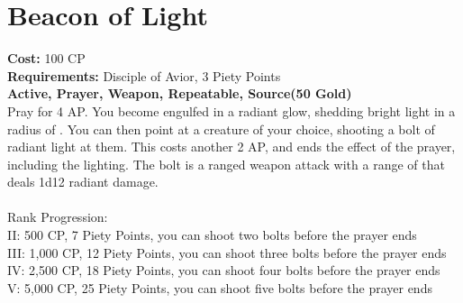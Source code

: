 \section{Beacon of Light}\label{prayer:beaconOfLight}
\textbf{Cost:} 100 CP\\
\textbf{Requirements:} Disciple of Avior, 3 Piety Points \\
\textbf{Active, Prayer, Weapon, Repeatable, Source(50 Gold)}\\
Pray for 4 AP. You become engulfed in a radiant glow, shedding bright light in a radius of .
You can then point at a creature of your choice, shooting a bolt of radiant light at them.
This costs another 2 AP, and ends the effect of the prayer, including the lighting.
The bolt is a ranged weapon attack with a range of  that deals 1d12 radiant damage.\\
\\
Rank Progression:\\
II: 500 CP, 7 Piety Points, you can shoot two bolts before the prayer ends\\
III: 1,000 CP, 12 Piety Points, you can shoot three bolts before the prayer ends\\
IV: 2,500 CP, 18 Piety Points, you can shoot four bolts before the prayer ends\\
V: 5,000 CP, 25 Piety Points, you can shoot five bolts before the prayer ends\\